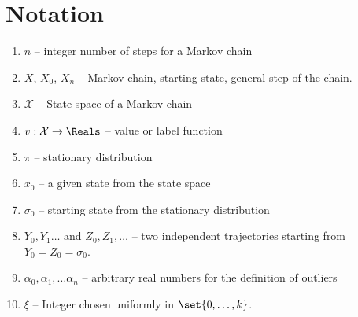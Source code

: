 \documentclass[12pt]{article}
\begin{document}
\section*{Notation}
\begin{enumerate}
    \item
        \( n \) -- integer number of steps for a Markov chain
    \item
        \( X \), \( X_0 \), \( X_n \) -- Markov chain, starting state,
        general step of the chain.
    \item
        \( \mathcal{X} \) -- State space of a Markov chain
    \item
        \( v :  \mathcal{X} \to \Reals \) -- value or label function
    \item
        \( \pi \) -- stationary distribution
    \item
        \( x_0 \) -- a given state from the state space
    \item
        \( \sigma_0 \) -- starting state from the stationary
        distribution
    \item
        \( Y_0 , Y_1 \dots \) and \( Z_0, Z_1, \dots \) -- two
        independent trajectories starting from \( Y_0 = Z_0 = \sigma_0 \).

    \item
        \( \alpha_0, \alpha_1, \dots \alpha_n \) -- arbitrary real
        numbers for the definition of outliers
    \item
        \( \xi \) -- Integer chosen uniformly in \( \set{0,\dots, k} \).


\end{enumerate}
\end{document}
